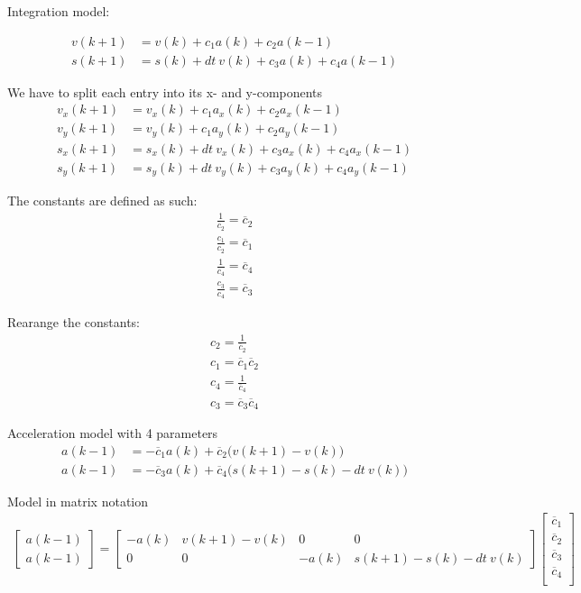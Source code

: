 \documentclass[10pt]{article}         %
\begin{document}
Integration model:

\begin{align}
v(k+1) &= v(k) + c_1 a(k) + c_2a(k-1)\\
s(k+1) &= s(k) + dt  \ v(k)+ c_3 a(k) + c_4 a(k-1)
\end{align}

We have to split each entry into its x- and y-components
\begin{align}
v_x(k+1)    &= v_x(k) + c_1 a_x(k)  +  c_2a_x(k-1)
\\ v_y(k+1) &= v_y(k) + c_1 a_y(k)  + c_2 a_y(k-1)
\\ s_x(k+1) &= s_x(k) + dt  \ v_x(k)+ c_3 a_x(k) + c_4 a_x(k-1)
\\ s_y(k+1) &= s_y(k) + dt \ v_y(k) + c_3 a_y(k) + c_4 a_y(k-1)
\end{align}



The constants are defined as such:
\begin{align}
\frac{1}{c_2} = \overline c_2
\\ \frac{c_1}{c_2} = \overline c_1 
\\ \frac{1}{c_4} = \overline c_4
\\ \frac{c_3}{c_4} = \overline c_3
\end{align}

Rearange the constants:
\begin{align}
c_2 =  \frac{1}{\overline c_2}
\\ c_1 = \overline c_1  \overline c_2
\\ c_4 = \frac{1}{\overline c_4}
\\ c_3 = \overline c_3 \overline c_4
\end{align}



Acceleration model with 4 parameters
\begin{align}
a(k-1) &= - \overline c_1 a(k)  + \overline c_2 \bigl( v(k+1) - v(k) \bigr) \\
a(k-1) &= - \overline c_3 a(k)  + \overline c_4 \bigl( s(k+1) - s(k) - dt \  v(k)\bigr)
\end{align}

Model in matrix notation
\begin{align}
    \begin{bmatrix}
        a(k-1) \\ a(k-1)       
    \end{bmatrix}
    =
    \begin{bmatrix}
         -a(k)  & v(k+1) - v(k)  & 0 & 0 \\
         0 & 0 & -a(k) &    s(k+1) - s(k) - dt \  v(k)
        \end{bmatrix}
        \begin{bmatrix}
        \overline c_1 \\
        \overline c_2 \\
        \overline c_3 \\
        \overline c_4 \\
    \end{bmatrix}
\end{align}
\end{document}
